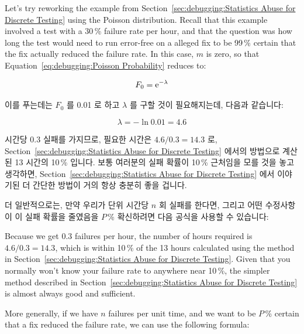Let's try reworking the example from
Section~\ref{sec:debugging:Statistics Abuse for Discrete Testing}
using the Poisson distribution.
Recall that this example involved a test with a 30\,\% failure rate per
hour, and that the question was how long the test would need to run
error-free
on a alleged fix to be 99\,\% certain that the fix actually reduced the
failure rate.
In this case, $m$ is zero, so that
Equation~\ref{eq:debugging:Poisson Probability} reduces to:

\fi

\begin{equation}
	F_0 =  \mathrm{e}^{-\lambda}
\end{equation}

이를 푸는데는 $F_0$ 를 0.01 로 하고 $\lambda$ 를 구할 것이 필요해지는데, 다음과
같습니다:

\begin{equation}
	\lambda = - \ln 0.01 = 4.6
\end{equation}

시간당 $0.3$ 실패를 가지므로, 필요한 시간은 $4.6/0.3 = 14.3$ 로,
Section~\ref{sec:debugging:Statistics Abuse for Discrete Testing} 에서의
방법으로 계산된 13 시간의 10\,\% 입니다.
보통 여러분의 실패 확률이 10\,\% 근처임을 모를 것을 놓고 생각하면,
Section~\ref{sec:debugging:Statistics Abuse for Discrete Testing}
에서 이야기된 더 간단한 방법이 거의 항상 충분히 좋을 겁니다.

더 일반적으로는, 만약 우리가 단위 시간당 $n$ 회 실패를 한다면, 그리고 어떤
수정사항이 이 실패 확률을 줄였음을 $P$\,\% 확신하려면 다음 공식을 사용할 수
있습니다:

\iffalse

Because we get $0.3$ failures per hour, the number of hours required
is $4.6/0.3 = 14.3$, which is within 10\,\% of the 13 hours
calculated using the method in
Section~\ref{sec:debugging:Statistics Abuse for Discrete Testing}.
Given that you normally won't know your failure rate to anywhere near
10\,\%, the simpler method described in
Section~\ref{sec:debugging:Statistics Abuse for Discrete Testing}
is almost always good and sufficient.

More generally, if we have $n$ failures per unit time, and we want to
be $P$\,\% certain that a fix reduced the failure rate, we can use the
following formula:

